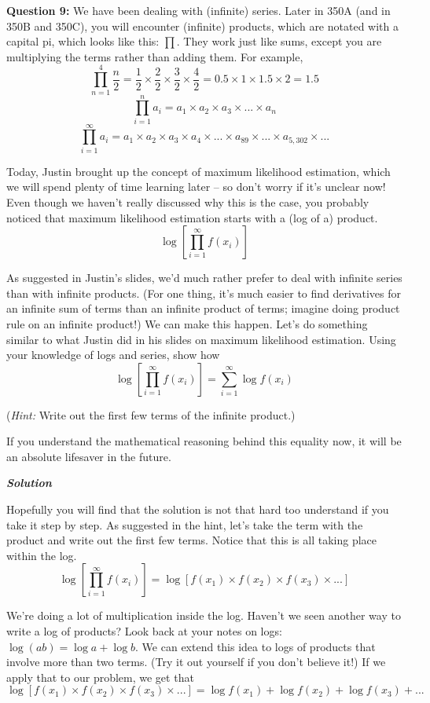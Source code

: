 \documentclass[12pt]{article}
\begin{document}
\bigskip

\textbf{Question 9:} We have been dealing with (infinite) series. Later in 350A (and in 350B and 350C), you will encounter (infinite) products, which are notated with a capital pi, which looks like this: $\prod$. They work just like sums, except you are multiplying the terms rather than adding them. For example, 
$$\prod_{n=1}^4 \frac{n}{2} = \frac{1}{2} \times \frac{2}{2} \times \frac{3}{2} \times \frac{4}{2} = 0.5 \times 1 \times 1.5 \times 2 = 1.5$$
$$\prod_{i=1}^n a_i = a_1 \times a_2 \times a_3 \times ... \times a_n$$
$$\prod_{i=1}^\infty a_i = a_1 \times a_2 \times a_3 \times a_4 \times ... \times a_{89} \times ... \times a_{5,302} \times ... $$

Today, Justin brought up the concept of maximum likelihood estimation, which we will spend plenty of time learning later -- so don't worry if it's unclear now! Even though we haven't really discussed why this is the case, you probably noticed that maximum likelihood estimation starts with a (log of a) product.
$$\log \left[\prod_{i=1}^{\infty} f(x_i)\right]$$

As suggested in Justin's slides, we'd much rather prefer to deal with infinite series than with infinite products. (For one thing, it's much easier to find derivatives for an infinite sum of terms than an infinite product of terms; imagine doing product rule on an infinite product!) We can make this happen. Let's do something similar to what Justin did in his slides on maximum likelihood estimation. Using your knowledge of logs and series, show how
\medskip
\begin{equation*}
\log \left[\prod_{i=1}^{\infty} f(x_i)\right] = \sum_{i=1}^\infty \log f(x_i)
\end{equation*}

({\it Hint:} Write out the first few terms of the infinite product.)

If you understand the mathematical reasoning behind this equality now, it will be an absolute lifesaver in the future.

\textbf{\textit{Solution}}

Hopefully you will find that the solution is not that hard too understand if you take it step by step. As suggested in the hint, let's take the term with the product and write out the first few terms. Notice that this is all taking place within the log. 
$$\log \left[\prod_{i=1}^{\infty} f(x_i)\right] = \log \left[f(x_1) \times f(x_2) \times f(x_3) \times ...\right]$$

We're doing a lot of multiplication inside the log. Haven't we seen another way to write a log of products? Look back at your notes on logs: $\log(ab) = \log a + \log b$. We can extend this idea to logs of products that involve more than two terms. (Try it out yourself if you don't believe it!) If we apply that to our problem, we get that
$$\log [f(x_1) \times f(x_2) \times f(x_3) \times ...] = \log f(x_1) + \log f(x_2) + \log f(x_3) + ...$$
\end{document}
